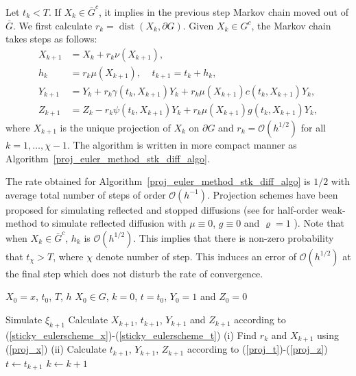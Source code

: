 \documentclass{article}
\theoremstyle{definition}
\DeclareMathOperator{\dist}{dist}
\numberwithin{equation}{section}
\begin{document}
Let $t_k < T$. If $X_{k} \in \bar{G}^{c}$, it implies in the previous step Markov chain moved out of $\bar{G}$.  We first calculate $r_k = \dist(X_k, \partial G)$. Given $X_k \in G^{c}$, the Markov chain takes steps as follows:
\begin{align}
X_{k+1} &= X_{k } + r_{k}\nu(X_{k+1}),\label{proj_x}\\ 
h_{k} &=  r_{k}\mu(X_{k+1}), \;\;\;\; 
t_{k+1} = t_{k} + h_{k}, \label{proj_t}\\
Y_{k+1} &= Y_{k} + r_{k}\gamma(t_{k},X_{k+1})Y_{k} + r_{k}\mu(X_{k+1})c(t_{k}, X_{k+1})Y_{k},\label{proj_y} \\
Z_{k+1} &= Z_{k} - r_{k}\psi(t_{k},X_{k+1})Y_{k} + r_{k}\mu(X_{k+1})g(t_{k}, X_{k+1})Y_{k},\label{proj_z}
\end{align}
where  $X_{k + 1}$ is the unique projection of $ X_k$ on $\partial G$ and $r_k =\mathcal{O}(h^{1/2})$ for all $k = 1,\dots,\chi-1$. The algorithm is written in more compact manner as Algorithm~\ref{proj_euler_method_stk_diff_algo}.


 The rate obtained for Algorithm~\ref{proj_euler_method_stk_diff_algo} is $1/2$  with average total number of steps of order $\mathcal{O}(h^{-1})$. Projection schemes have been proposed for simulating reflected and stopped diffusions (see \cite{costantini_pachhiarotti_sartoretto98} for half-order weak-method to simulate reflected diffusion with $\mu \equiv 0$, $g\equiv 0$ and $\varrho = 1$ ). Note that when $X_{k} \in \bar{G}^{c}$, $h_{k}$ is $\mathcal{O}(h^{1/2})$. This implies that there is non-zero probability that $t_{\chi} > T$, where $\chi$ denote number of step. This induces an error of $\mathcal{O}(h^{1/2})$ at the final step which does not disturb the rate of convergence.  


\begin{algorithm}
\caption{Projected Euler method for sticky diffusion}\label{proj_euler_method_stk_diff_algo}
\small  %
\setlength{\baselineskip}{0.9\baselineskip}
\begin{algorithmic}
\Require $X_0 = x$, $t_0$, $T$, $h$
\Ensure $X_0 \in G$, $k = 0$, $ t = t_0$,  $Y_0 = 1$ and $Z_0 = 0$



\State Simulate $ \xi_{k+1} $ 
   \State  Calculate $X_{k+1}$, $t_{k+1}$, $Y_{k+1}$ and $Z_{k+1}$  according to (\ref{sticky_eulerscheme_x})-(\ref{sticky_eulerscheme_t})
\Else
    \State (i) Find $r_k$ and $X_{k+1}$ using (\ref{proj_x})
    \State (ii) Calculate $t_{k+1}$, $Y_{k+1}$, $Z_{k+1}$ according to (\ref{proj_t})-(\ref{proj_z})
\EndIf
\State $t \gets t_{k+1}$
\State $k \gets k+1$
\EndWhile
\end{algorithmic}
\end{algorithm}
\end{document}
